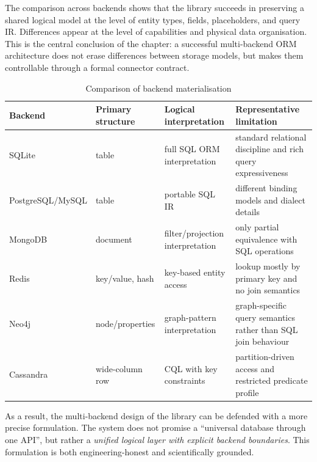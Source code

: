 The comparison across backends shows that the library succeeds in preserving a shared logical model at the level of entity types, fields, placeholders, and query IR. Differences appear at the level of capabilities and physical data organisation. This is the central conclusion of the chapter: a successful multi-backend ORM architecture does not erase differences between storage models, but makes them controllable through a formal connector contract.

\begin{table}[H]
\centering
\small
\caption{Comparison of backend materialisation}
\label{tab:backend_materialisation}
\begin{tabularx}{\textwidth}{L{2.0cm}L{2.5cm}L{2.8cm}Y}
\toprule
\textbf{Backend} & \textbf{Primary structure} & \textbf{Logical interpretation} & \textbf{Representative limitation} \\
\midrule
SQLite & table & full SQL ORM interpretation & standard relational discipline and rich query expressiveness \\
PostgreSQL/MySQL & table & portable SQL IR & different binding models and dialect details \\
MongoDB & document & filter/projection interpretation & only partial equivalence with SQL operations \\
Redis & key/value, hash & key-based entity access & lookup mostly by primary key and no join semantics \\
Neo4j & node/properties & graph-pattern interpretation & graph-specific query semantics rather than SQL join behaviour \\
Cassandra & wide-column row & CQL with key constraints & partition-driven access and restricted predicate profile \\
\bottomrule
\end{tabularx}
\end{table}

As a result, the multi-backend design of the library can be defended with a more precise formulation. The system does not promise a ``universal database through one API'', but rather a \emph{unified logical layer with explicit backend boundaries}. This formulation is both engineering-honest and scientifically grounded.
